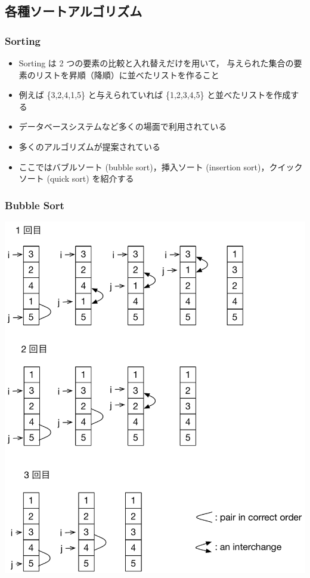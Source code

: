 \subsection{各種ソートアルゴリズム}
\begin{frame}[shrink]
\frametitle{Sorting}
  \begin{itemize}
\item Sorting は 2 つの要素の比較と入れ替えだけを用いて，
与えられた集合の要素のリストを昇順（降順）に並べたリストを作ること
\item 例えば \{3,2,4,1,5\} と与えられていれば \{1,2,3,4,5\} と並べたリストを作成する
\item データベースシステムなど多くの場面で利用されている
\item 多くのアルゴリズムが提案されている
\item ここではバブルソート (bubble sort)，挿入ソート (insertion sort)，クイックソート (quick sort) を紹介する
  \end{itemize}
\end{frame}
\begin{frame}[shrink]
\frametitle{Bubble Sort}
  \begin{center}
\includegraphics[scale=0.4]{./Figure/bubble_sort.pdf}
  \end{center}
\end{frame}
